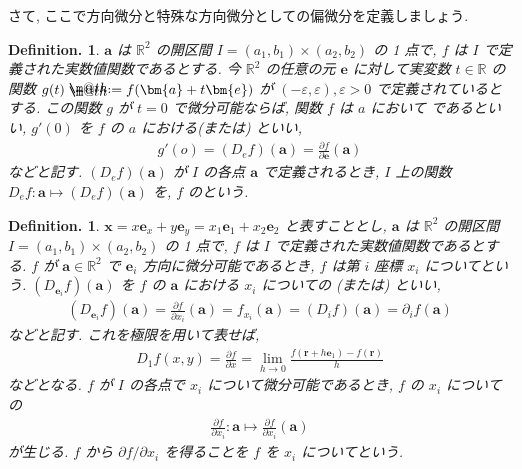 \documentclass[openany, a4paper, oneside]{jsbook}
\makeatletter
\newcommand*{\defeq}{\mathrel{\rlap{%
\raisebox{0.3ex}{$\m@th\cdot$}}%
\raisebox{-0.3ex}{$\m@th\cdot$}}%
=}
\theoremstyle{break}
\theoremstyle{breakdefn}
\newtheorem{defn}[thm]{Definition.}
\newcommand{\bbR}{\mathbb{R}}
\newcommand{\vep}{\varepsilon}
\makeatother
\begin{document}
さて, ここで方向微分と特殊な方向微分としての偏微分を定義しましょう.
\begin{defn}
 $\bm{a}$ は $\bbR^2$ の開区間 $I=(a_1,b_1)\times (a_2,b_2)$ の 1 点で,
 $f$ は $I$ で定義された実数値関数であるとする.
今 $\bbR^2$ の任意の元 $\bm{e}$ に対して実変数 $t\in\bbR$ の関数
 $g (t)\defeq f (\bm{a}+t\bm{e})$ が $(-\vep,\vep),\vep>0$ で定義されているとする.
この関数 $g$ が $t=0$ で微分可能ならば, 関数 $f$ は $a$ において
であるといい,  $g'(0)$ を $f$ の
 $a$ における(または) といい,
    \begin{align}
        g'(o)
        =
        (D_ef) (\bm{a})
        =
        \frac{\partial f} {\partial \bm{e}}(\bm{a})
    \end{align}
などと記す.  $(D_ef) (\bm{a})$ が $I$ の各点 $\bm{a}$ で定義されるとき,  $I$ 上の関数
 $D_ef:\bm{a}\mapsto (D_ef) (\bm{a})$ を,  $f$ のという.
\end{defn}
\begin{defn}
 $\bm{x}=x\bm{e}_x+y\bm{e}_y=x_1\bm{e}_1+x_2\bm{e}_2$ と表すこととし,
 $\bm{a}$ は $\bbR^2$ の開区間 $I=(a_1,b_1)\times (a_2,b_2)$ の 1 点で,
 $f$ は $I$ で定義された実数値関数であるとする.
 $f$ が $\bm{a}\in\bbR^2$ で $\bm{e}_i$ 方向に微分可能であるとき,
 $f$ は第 $i$ 座標 $x_i$ についてという.
 $(D_{\bm{e}_i}f) (\bm{a})$ を $f$ の $\bm{a}$ における $x_i$ についての
(または) といい,
\begin{align}
 (D_{\bm{e}_i}f) (\bm{a})
 =
 \frac{\partial f} {\partial x_i}(\bm{a})
 =
 f_{x_i}(\bm{a})
 =
 (D_if) (\bm{a})
 =
 \partial _i f (\bm{a})
\end{align}
などと記す.
これを極限を用いて表せば,
\begin{align}
 D_1f (x,y)
 =
 \frac{\partial f} {\partial x}
 =
 \lim_{h\to 0}\frac{f ( \bm{r} + h \bm{e}_1 ) - f (\bm{r}) } {h}
\end{align}
などとなる.
$f$ が $I$ の各点で $x_i$ について微分可能であるとき, $f$ の $x_i$ についての
\begin{align}
 \frac{\partial f}{\partial x_i}:\bm{a} \mapsto \frac{\partial f}{\partial x_i}(\bm{a})
\end{align}
が生じる.  $f$ から $\partial f/ \partial x_i$ を得ることを $f$ を $x_i$ についてという.
\end{defn}
\end{document}

